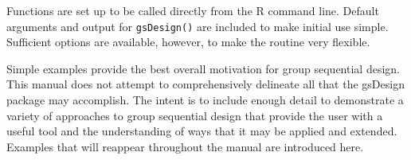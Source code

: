 Functions are set up to be called directly from the R command line. Default
arguments and output for \texttt{gsDesign()} are included to make initial use
simple. Sufficient options are available, however, to make the routine very
flexible. 

Simple examples provide the best overall motivation for group sequential design. This manual does not attempt to comprehensively delineate all that the gsDesign package may accomplish. 
The intent is to include enough detail to demonstrate a variety of approaches to group sequential design that provide the user with a useful tool and the understanding of ways that it may be applied and extended. 
Examples that will reappear throughout the manual are introduced here.
